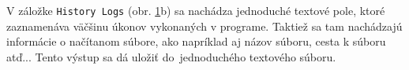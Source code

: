 \documentclass[a4paper,11pt,oneside]{article}%
\begin{document}
\begin{figure}[H]%
    \centering
    \qquad
    \caption{}%
    \label{fig:uidata2}%
\end{figure}

V záložke \texttt{History Logs} (obr. \ref{fig:uidata2}b) sa nachádza jednoduché textové pole, ktoré zaznamenáva väčšinu úkonov vykonaných v programe. Taktiež sa tam nachádzajú informácie o načítanom súbore, ako napríklad aj názov súboru, cesta k súboru atď... Tento výstup sa dá uložiť do~jednoduchého textového súboru.
\end{document}
